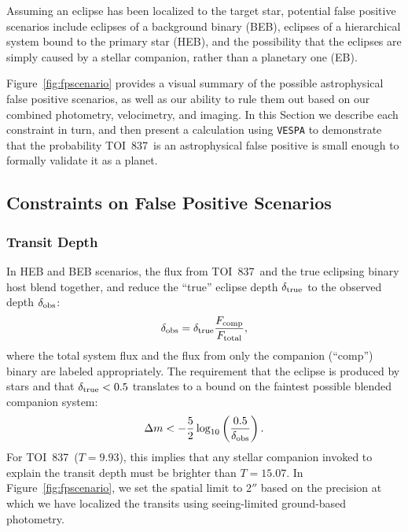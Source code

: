 \documentclass[12pt,twocolumn,tighten]{aastex63}
\newcommand{\tn}{TOI~837} %
\begin{document}
Assuming an eclipse has been localized to the target star, potential
false positive scenarios include eclipses of a background binary
(BEB), eclipses of a hierarchical system bound to the primary star
(HEB), and the possibility that the eclipses are simply caused by a
stellar companion, rather than a planetary one (EB).

Figure~\ref{fig:fpscenario} provides a visual summary of the possible
astrophysical false positive scenarios, as well as our ability to rule
them out based on our combined photometry, velocimetry, and imaging.
In this Section we describe each constraint in turn, and then present a
calculation using \texttt{VESPA} \citep{morton_efficient_2012} to
demonstrate that the probability \tn\ is an astrophysical false
positive is small enough to formally validate it as a planet.



\subsection{Constraints on False Positive Scenarios}
\label{subsec:fp_constraints}

\subsubsection{Transit Depth}
In HEB and BEB scenarios, the flux from \tn\ and the true eclipsing
binary host blend together, and reduce the ``true'' eclipse depth
$\delta_{\rm true}$ to the observed depth
$\delta_{\rm obs}$:
\begin{equation}
  \delta_{\rm obs}
  = 
  \delta_{\rm true} \frac{F_{\rm comp}}{F_{\rm total}},
\end{equation}
where the total system flux and the flux from only the companion
(``comp'') binary are labeled appropriately.  The requirement that the
eclipse is produced by stars and that $\delta_{\rm true} < 0.5$
translates to a bound on the faintest possible blended companion
system:
\begin{equation}
  \Delta m < -\frac{5}{2} \log_{10}
             \left( \frac{0.5}{\delta_{\rm obs}} \right).
\end{equation}
For \tn\ ($T=9.93$), this implies that any stellar companion invoked
to explain the transit depth must be brighter than $T=15.07$.  In
Figure~\ref{fig:fpscenario}, we set the spatial limit to 2$''$ based
on the precision at which we have localized the transits using
seeing-limited ground-based photometry.
\end{document}
